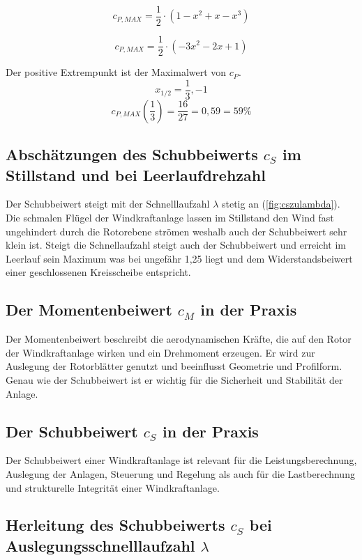 \begin{equation}
c_{P,MAX}= \frac{1}{2} \cdot (1-x^2+x-x^3)
\label{eq:CPMAX}
\end{equation}

\begin{equation}
c_{P,MAX}=\frac{1}{2} \cdot (-3x^2-2x+1)
\label{eq:CPMAX2}
\end{equation}
 
Der positive Extrempunkt ist der Maximalwert von $c_P$.  $$x_{1/2}= \frac{1}{3}, -1$$
$$c_{P,MAX}(\frac{1}{3})= \frac{16}{27} = 0,59 = 59\%$$

\subsection{Abschätzungen des Schubbeiwerts \texorpdfstring{$c_S$}{} im Stillstand und bei
Leerlaufdrehzahl}

Der Schubbeiwert steigt mit der Schnelllaufzahl $\lambda$ stetig an (\ref{fig:cszulambda}). Die schmalen Flügel der Windkraftanlage lassen im Stillstand den Wind fast ungehindert durch die Rotorebene strömen weshalb auch der Schubbeiwert sehr klein ist. Steigt die Schnellaufzahl steigt auch der Schubbeiwert und erreicht im Leerlauf sein Maximum was bei ungefähr 1,25 liegt und dem Widerstandsbeiwert einer geschlossenen Kreisscheibe entspricht. 


\subsection{Der Momentenbeiwert \texorpdfstring{$c_M$}{} in der Praxis}

Der Momentenbeiwert beschreibt die aerodynamischen Kräfte, die auf den Rotor der Windkraftanlage wirken und ein Drehmoment erzeugen. Er wird zur Auslegung der Rotorblätter genutzt und beeinflusst Geometrie und Profilform. Genau wie der Schubbeiwert ist er wichtig für die Sicherheit und Stabilität der Anlage. 


\subsection{Der Schubbeiwert \texorpdfstring{$c_S$}{} in der Praxis}

Der Schubbeiwert einer Windkraftanlage ist relevant für die Leistungsberechnung, Auslegung der Anlagen, Steuerung und Regelung als auch für die Lastberechnung und strukturelle Integrität einer Windkraftanlage. 

\subsection{Herleitung des Schubbeiwerts \texorpdfstring{$c_S$}{} bei Auslegungsschnelllaufzahl \texorpdfstring{$\lambda$}{}}

